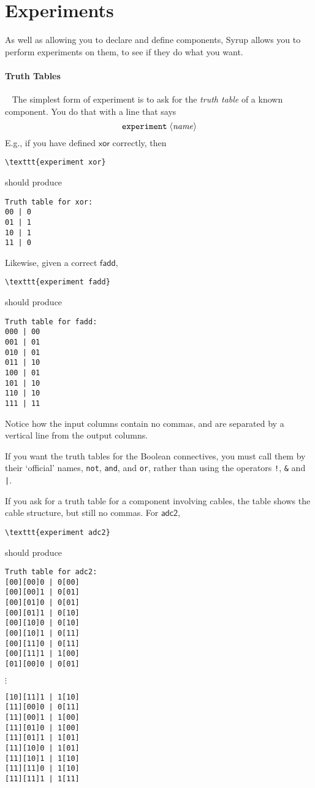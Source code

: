 \documentclass{article}
\newcommand{\C}{\mathsf}
\begin{document}
\section{Experiments}

As well as allowing you to declare and define components, Syrup allows
you to perform experiments on them, to see if they do what you want.

\paragraph{Truth Tables}~
The simplest form of experiment is to ask for the \emph{truth table}
of a known component. You do that with a line that says
\[
\texttt{experiment}\; \langle\mathit{name}\rangle
\]
E.g., if you have defined $\C{xor}$ correctly, then
\begin{verbatim}
\texttt{experiment xor}
\end{verbatim}
should produce
\begin{verbatim}
Truth table for xor:
00 | 0
01 | 1
10 | 1
11 | 0
\end{verbatim}

Likewise, given a correct $\C{fadd}$,
\begin{verbatim}
\texttt{experiment fadd}
\end{verbatim}
should produce
\begin{verbatim}
Truth table for fadd:
000 | 00
001 | 01
010 | 01
011 | 10
100 | 01
101 | 10
110 | 10
111 | 11
\end{verbatim}

Notice how the input columns contain no commas, and are separated by a
vertical line from the output columns.

If you want the truth tables for the Boolean connectives, you must
call them by their `official' names, \texttt{not}, \texttt{and}, and
\texttt{or}, rather than using the operators \texttt{!}, \texttt{\&}
and \texttt{|}.

If you ask for a truth table for a component involving cables,
the table shows the cable structure, but still no commas. For
$\C{adc2}$,
\begin{verbatim}
\texttt{experiment adc2}
\end{verbatim}
should produce
\begin{verbatim}
Truth table for adc2:
[00][00]0 | 0[00]
[00][00]1 | 0[01]
[00][01]0 | 0[01]
[00][01]1 | 0[10]
[00][10]0 | 0[10]
[00][10]1 | 0[11]
[00][11]0 | 0[11]
[00][11]1 | 1[00]
[01][00]0 | 0[01]
\end{verbatim}
$\vdots$
\begin{verbatim}
[10][11]1 | 1[10]
[11][00]0 | 0[11]
[11][00]1 | 1[00]
[11][01]0 | 1[00]
[11][01]1 | 1[01]
[11][10]0 | 1[01]
[11][10]1 | 1[10]
[11][11]0 | 1[10]
[11][11]1 | 1[11]
\end{verbatim}
\end{document}
